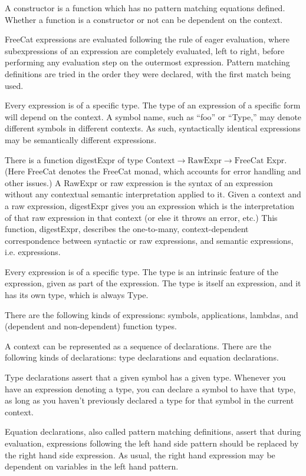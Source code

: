 \documentclass{article}
\begin{document}
A constructor is a function which has no pattern matching equations defined. Whether a function is a constructor or not can be dependent on the context.

FreeCat expressions are evaluated following the rule of eager evaluation, where subexpressions of an expression are completely evaluated, left to right, before performing any evaluation step on the outermost expression. Pattern matching definitions are tried in the order they were declared, with the first match being used.

Every expression is of a specific type. The type of an expression of a specific form will depend on the context. A symbol name, such as ``foo'' or ``Type,'' may denote different symbols in different contexts. As such, syntactically identical expressions may be semantically different expressions.

There is a function digestExpr of type $\text{Context} \to \text{RawExpr} \to \text{FreeCat Expr}$. (Here FreeCat denotes the FreeCat monad, which accounts for error handling and other issues.) A RawExpr or raw expression is the syntax of an expression without any contextual semantic interpretation applied to it. Given a context and a raw expression, digestExpr gives you an expression which is the interpretation of that raw expression in that context (or else it throws an error, etc.) This function, digestExpr, describes the one-to-many, context-dependent correspondence between syntactic or raw expressions, and semantic expressions, i.e. expressions.

Every expression is of a specific type. The type is an intrinsic feature of the expression, given as part of the expression. The type is itself an expression, and it has its own type, which is always Type.

There are the following kinds of expressions: symbols, applications, lambdas, and (dependent and non-dependent) function types.

A context can be represented as a sequence of declarations. There are the following kinds of declarations: type declarations and equation declarations.

Type declarations assert that a given symbol has a given type. Whenever you have an expression denoting a type, you can declare a symbol to have that type, as long as you haven't previously declared a type for that symbol in the current context.

Equation declarations, also called pattern matching definitions, assert that during evaluation, expressions following the left hand side pattern should be replaced by the right hand side expression. As usual, the right hand expression may be dependent on variables in the left hand pattern.
\end{document}
